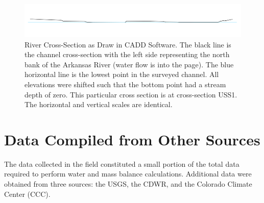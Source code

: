 \begin{figure}[htbp]
\centering
	\includegraphics[width=6in]{Figures/LineDiagram/USS1Trim}
	\caption[River Cross-Section as Draw in CADD Software.]{River Cross-Section as Draw in CADD Software.  The black line is the channel cross-section with the left side representing the north bank of the Arkansas River (water flow is into the page).  The blue horizontal line is the lowest point in the surveyed channel.  All elevations were shifted such that the bottom point had a stream depth of zero.  This particular cross section is at cross-section USS1.  The horizontal and vertical scales are identical.}
	\label{fig:SurveySection}
\end{figure}

%

\clearpage{}
\section{Data Compiled from Other Sources}
\label{sec:data collected by other sources}
The data collected in the field constituted a small portion of the total data required to perform water and mass balance calculations.  Additional data were obtained from three sources: the USGS, the CDWR, and the Colorado Climate Center (CCC).

